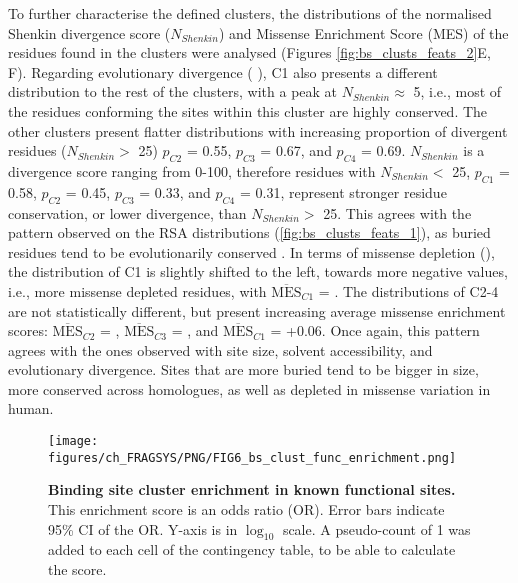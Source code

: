 To further characterise the defined clusters, the distributions of the normalised Shenkin divergence score ($N_{Shenkin}$) and Missense Enrichment Score (MES) of the residues found in the clusters were analysed (Figures \ref{fig:bs_clusts_feats_2}E, F). Regarding evolutionary divergence ( ), C1 also presents a different distribution to the rest of the clusters, with a peak at $N_{Shenkin} \approx$ 5, i.e., most of the residues conforming the sites within this cluster are highly conserved. The other clusters present flatter distributions with increasing proportion of divergent residues ($N_{Shenkin} >$ 25) $p_{C2}$ = 0.55, $p_{C3}$ = 0.67, and $p_{C4}$ = 0.69. $N_{Shenkin}$ is a divergence score ranging from 0-100, therefore residues with $N_{Shenkin} <$ 25, $p_{C1}$ = 0.58, $p_{C2}$ = 0.45, $p_{C3}$ = 0.33, and $p_{C4}$ = 0.31, represent stronger residue conservation, or lower divergence, than $N_{Shenkin} >$ 25. This agrees with the pattern observed on the RSA distributions (\autoref{fig:bs_clusts_feats_1}), as buried residues tend to be evolutionarily conserved \cite{CHOTHIA_1986_CONSERVATION, RUSSELL_1994_UNCONSERVATION}. In terms of missense depletion (), the distribution of C1 is slightly shifted to the left, towards more negative values, i.e., more missense depleted residues, with $\overline{\text{MES}}_{C1}$ = . The distributions of C2-4 are not statistically different, but present increasing average missense enrichment scores: $\overline{\text{MES}}_{C2}$ = , $\overline{\text{MES}}_{C3}$ = , and $\overline{\text{MES}}_{C1}$ = +0.06. Once again, this pattern agrees with the ones observed with site size, solvent accessibility, and evolutionary divergence. Sites that are more buried tend to be bigger in size, more conserved across homologues, as well as depleted in missense variation in human.

\begin{figure}[htb!]
    \centering
    \texttt{[image: figures/ch\_FRAGSYS/PNG/FIG6\_bs\_clust\_func\_enrichment.png]}
    \caption[Binding site cluster enrichment in known functional sites]{\textbf{Binding site cluster enrichment in known functional sites.} This enrichment score is an odds ratio (OR). Error bars indicate 95\% CI of the OR. Y-axis is in $\log_{10}$ scale. A pseudo-count of 1 was added to each cell of the contingency table, to be able to calculate the score.}
    \label{fig:bs_clusts_enrichment}
\end{figure}

